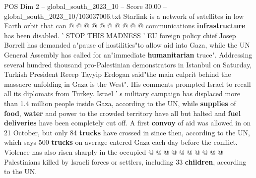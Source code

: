 \begin{textsample}{POS Dim 2 – global\_south\_2023\_10 – Score 30.00 – global\_south\_2023\_10/103037006.txt}
Starlink is a network of satellites in low Earth orbit that can @ @ @ @ @ @ @ @ @ @ communications \textbf{infrastructure} has been disabled. ' STOP THIS MADNESS ' EU foreign policy chief Josep Borrell has demanded a"pause of hostilities"to allow aid into Gaza, while the UN General Assembly has called for an"immediate \textbf{humanitarian} truce".
Addressing several hundred thousand pro-Palestinian demonstrators in Istanbul on Saturday, Turkish President Recep Tayyip Erdogan said"the main culprit behind the massacre unfolding in Gaza is the West".
His comments prompted Israel to recall all its diplomats from Turkey.
Israel ' s military campaign has displaced more than 1.4 million people inside Gaza, according to the UN, while \textbf{supplies} of \textbf{food}, \textbf{water} and power to the crowded territory have all but halted and \textbf{fuel} \textbf{deliveries} have been completely cut off.
A first \textbf{convoy} of aid was allowed in on 21 October, but only 84 \textbf{trucks} have crossed in since then, according to the UN, which says 500 \textbf{trucks} on average entered Gaza each day before the conflict.
Violence has also risen sharply in the occupied @ @ @ @ @ @ @ @ @ @ Palestinians killed by Israeli forces or settlers, including 33 \textbf{children}, according to the UN.

\end{textsample}

